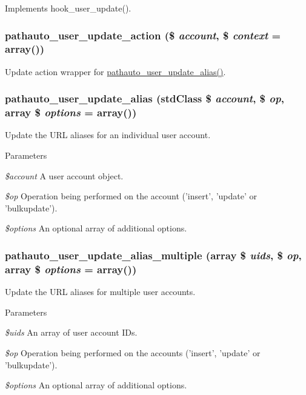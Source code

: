 \label{pathauto_8module_ac2569a0defd03ecce4977acb75c6db3e}
Implements hook\_\-user\_\-update(). \hypertarget{pathauto_8module_a2fd42a248c056cf7d45629b64ed3ffb9}{
\subsubsection[{pathauto\_\-user\_\-update\_\-action}]{\setlength{\rightskip}{0pt plus 5cm}pathauto\_\-user\_\-update\_\-action (\$ {\em account}, \/  \$ {\em context} = {\ttfamily array()})}}
\label{pathauto_8module_a2fd42a248c056cf7d45629b64ed3ffb9}
Update action wrapper for \hyperlink{pathauto_8module_a201f74ecc823bdf66f3a58bf41dfa532}{pathauto\_\-user\_\-update\_\-alias()}. \hypertarget{pathauto_8module_a201f74ecc823bdf66f3a58bf41dfa532}{
\subsubsection[{pathauto\_\-user\_\-update\_\-alias}]{\setlength{\rightskip}{0pt plus 5cm}pathauto\_\-user\_\-update\_\-alias (stdClass \$ {\em account}, \/  \$ {\em op}, \/  array \$ {\em options} = {\ttfamily array()})}}
\label{pathauto_8module_a201f74ecc823bdf66f3a58bf41dfa532}
Update the URL aliases for an individual user account.


\begin{DoxyParams}{Parameters}
\item[{\em \$account}]A user account object. \item[{\em \$op}]Operation being performed on the account ('insert', 'update' or 'bulkupdate'). \item[{\em \$options}]An optional array of additional options. \end{DoxyParams}
\hypertarget{pathauto_8module_a764a68ac848f7a0699787a3c76cd1046}{
\subsubsection[{pathauto\_\-user\_\-update\_\-alias\_\-multiple}]{\setlength{\rightskip}{0pt plus 5cm}pathauto\_\-user\_\-update\_\-alias\_\-multiple (array \$ {\em uids}, \/  \$ {\em op}, \/  array \$ {\em options} = {\ttfamily array()})}}
\label{pathauto_8module_a764a68ac848f7a0699787a3c76cd1046}
Update the URL aliases for multiple user accounts.


\begin{DoxyParams}{Parameters}
\item[{\em \$uids}]An array of user account IDs. \item[{\em \$op}]Operation being performed on the accounts ('insert', 'update' or 'bulkupdate'). \item[{\em \$options}]An optional array of additional options. \end{DoxyParams}
